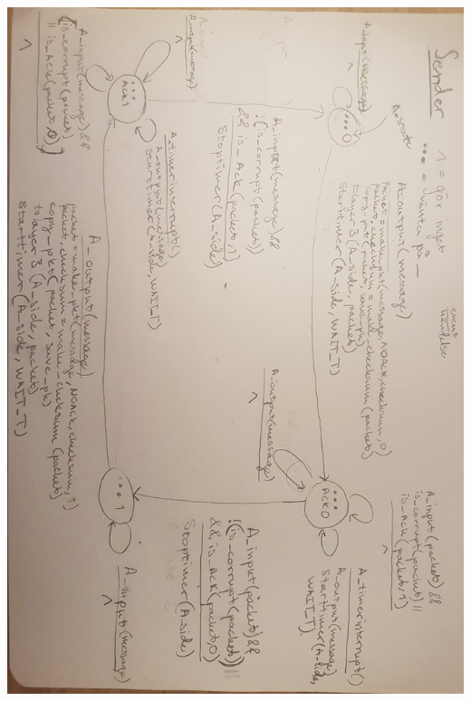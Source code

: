 \begin{center}
\includegraphics[width=\linewidth]{bilder/sender.jpg}
\label{fig:sender}
\end{center}

